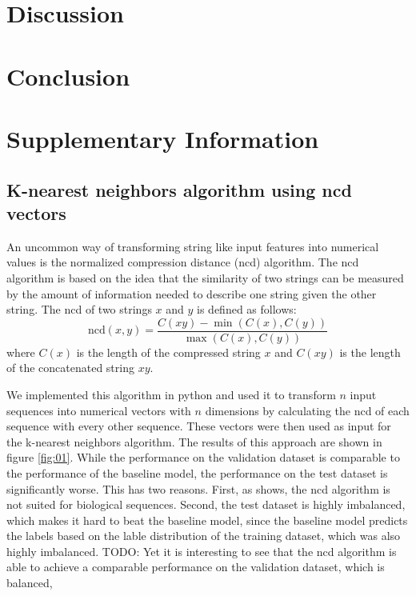 \documentclass{bioinfo}
\begin{document}
\section{Discussion}
\lipsum[1]

\section{Conclusion}
\lipsum[1]

\section{Supplementary Information}
\lipsum[1]

\subsection{K-nearest neighbors algorithm using ncd vectors}
An uncommon way of transforming string like input features into numerical values is the normalized compression distance (ncd) algorithm. 
The ncd algorithm is based on the idea that the similarity of two strings can be measured by the amount of information needed to describe one string given the other string.
The ncd of two strings $x$ and $y$ is defined as follows:
\begin{equation}
	\text{ncd}(x,y) = \frac{C(xy)-\min(C(x),C(y))}{\max(C(x),C(y))}
\end{equation}
where $C(x)$ is the length of the compressed string $x$  and $C(xy)$ is the length of the concatenated string $xy$. 

We implemented this algorithm in python and used it to transform $n$ input sequences into numerical vectors with $n$ dimensions by 
calculating the ncd of each sequence with every other sequence. These vectors were then used as input for the  k-nearest neighbors algorithm.
The results of this approach are shown in figure \ref{fig:01}. While the performance on the validation dataset is comparable to the performance of the baseline model, 
the performance on the test dataset is significantly worse. This has two reasons. First, as %
shows, the ncd algorithm is not suited for biological sequences. Second, the test dataset is highly imbalanced, which makes it hard to beat the baseline model, 
since the baseline model predicts the labels based on the lable distribution of the training dataset, which was also highly imbalanced.
TODO: Yet it is interesting to see that the ncd algorithm is able to achieve a comparable performance on the validation dataset, which is balanced,
\end{document}
